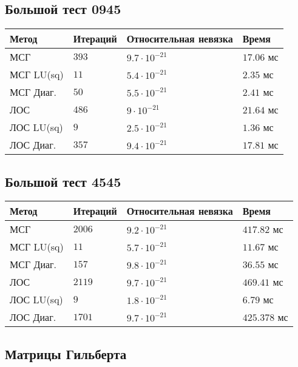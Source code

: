 \subsection{Большой тест 0945}

\setlength{\tabcolsep}{2pt}
\tabulinesep=0.3mm
\noindent\begin{tabu}{|X[-1,l]|X[-1,l]|X[-1,l]|X[-1,l]|}
\hline
Метод & Итераций & Относительная невязка & Время \\ \hline
МСГ & $393$ & $9.7\cdot 10^{-21}$ & $17.06$ мс \\ \hline
МСГ LU(sq) & $11$ & $5.4 \cdot 10^{-21}$ & $2.35$ мс \\ \hline
МСГ Диаг. & $50$ & $5.5 \cdot 10^{-21}$ & $2.41$ мс \\ \hline
ЛОС & $486$ & $9 \cdot 10^{-21}$ & $21.64$ мс \\ \hline
{}
ЛОС LU(sq) & $9$ & $2.5 \cdot 10^{-21}$ & $1.36$ мс \\ \hline
ЛОС Диаг. & $357$ & $9.4 \cdot 10^{-21}$ & $17.81$ мс \\ \hline
\end{tabu}

\subsection{Большой тест 4545}

\setlength{\tabcolsep}{2pt}
\tabulinesep=0.3mm
\noindent\begin{tabu}{|X[-1,l]|X[-1,l]|X[-1,l]|X[-1,l]|}
\hline
Метод & Итераций & Относительная невязка & Время \\ \hline
МСГ & $2006$ & $9.2\cdot 10^{-21}$ & $417.82$ мс \\ \hline
МСГ LU(sq) & $11$ & $5.7 \cdot 10^{-21}$ & $11.67$ мс \\ \hline
МСГ Диаг. & $157$ & $9.8 \cdot 10^{-21}$ & $36.55$ мс \\ \hline
ЛОС & $2119$ & $9.7 \cdot 10^{-21}$ & $469.41$ мс \\ \hline
{}
ЛОС LU(sq) & $9$ & $1.8 \cdot 10^{-21}$ & $6.79$ мс \\ \hline
ЛОС Диаг. & $1701$ & $9.7 \cdot 10^{-21}$ & $425.378$ мс \\ \hline
\end{tabu}

\subsection{Матрицы Гильберта}

